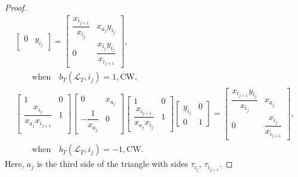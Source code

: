 \documentclass[10pt,a4paper]{amsart}
\numberwithin{equation}{section}
\theoremstyle{definition}
\begin{document}
\begin{proof}
\begin{gather}
\begin{bmatrix}
 0 & y_{i_j}
 \end{bmatrix}=
 \begin{bmatrix}
 \dfrac{x_{i_{j+1}}}{x_{i_j}} & x_{a_j}y_{i_j}\\
 0 & \dfrac{x_{i_j}y_{i_j}}{x_{i_{j+1}}}
 \end{bmatrix} ,\nonumber\\
 \qquad \text{when}\quad b_T(\mathcal{L}_T, i_j)=1, \text{CW},\label{eqn:cw+1}\\
 \begin{bmatrix}
 1 & 0\\
 \dfrac{x_{i_j}}{x_{a_j}x_{i_{j+1}}} & 1\\
 \end{bmatrix}
 \begin{bmatrix}
 0 & x_{a_j}\\
 -\dfrac{1}{x_{a_j}} & 0
 \end{bmatrix}
 \begin{bmatrix}
 1 & 0\\
 \dfrac{x_{i_{j+1}}}{x_{a_j}x_{i_j}} & 1
 \end{bmatrix}
 \begin{bmatrix}
 y_{i_j} & 0\\
 0 & 1
 \end{bmatrix}=
 \begin{bmatrix}
 \dfrac{x_{i_{j+1}}y_{i_j}}{x_{i_j}} & x_{a_j}\\
 0 & \dfrac{x_{i_j}}{x_{i_{j+1}}}
 \end{bmatrix}, \nonumber\\
\qquad \text{when}\quad b_T(\mathcal{L}_T, i_j)=-1, \text{CW}.\label{eqn:cw-1}
\end{gather}
Here, $a_j$ is the third side of the triangle with sides $\tau_{i_j}$, $\tau_{i_{j+1}}$.


\end{proof}
\end{document}
